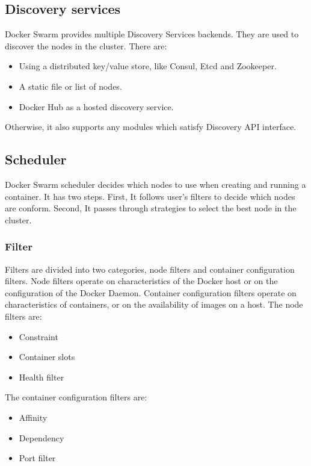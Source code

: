 \subsection{Discovery services}
Docker Swarm provides multiple Discovery Services backends. They are used to discover the nodes in the cluster. There are:
\begin{itemize}
    \item Using a distributed key/value store, like Consul, Etcd and Zookeeper.
    \item A static file or list of nodes.
    \item Docker Hub as a hosted discovery service.
\end{itemize}
Otherwise, it also supports any modules which satisfy Discovery API interface.

\subsection{Scheduler}
Docker Swarm scheduler decides which nodes to use when creating and running a container. It has two steps.
First, It follows user's filters to decide which nodes are conform.
Second, It passes through strategies to select the best node in the cluster.

\subsubsection{Filter}
Filters are divided into two categories, node filters and container configuration filters. Node filters operate on characteristics of the Docker host or on the configuration of the Docker Daemon.
Container configuration filters operate on characteristics of containers, or on the availability of images on a host.
The node filters are:
\begin{itemize}
    \item Constraint
    \item Container slots
    \item Health filter
\end{itemize}
The container configuration filters are:
\begin{itemize}
    \item Affinity
    \item Dependency
    \item Port filter
\end{itemize}

